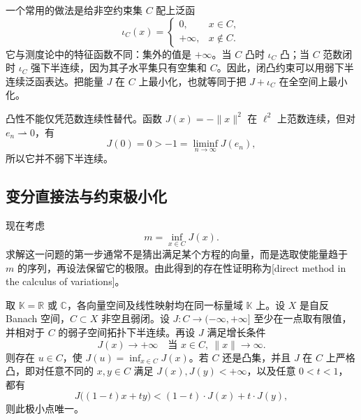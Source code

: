 一个常用的做法是给非空约束集 \(C\) 配上泛函
\[
  \iota_C(x)=
  \begin{cases}
    0,&x\in C,\\
    +\infty,&x\notin C.
  \end{cases}
\]
它与测度论中的特征函数不同：集外的值是 \(+\infty\)。当 \(C\) 凸时 \(\iota_C\) 凸；当 \(C\) 范数闭时 \(\iota_C\) 强下半连续，因为其子水平集只有空集和 \(C\)。因此，闭凸约束可以用弱下半连续泛函表达。把能量 \(J\) 在 \(C\) 上最小化，也就等同于把 \(J+\iota_C\) 在全空间上最小化。

\ProseParagraphBreak

凸性不能仅凭范数连续性替代。函数 \(J(x)=-\|x\|^2\) 在 \(\ell^2\) 上范数连续，但对 \(e_n\rightharpoonup0\)，有
\[
  J(0)=0>-1=\liminf_{n\to\infty}J(e_n),
\]
所以它并不弱下半连续。

\subsection{变分直接法与约束极小化}
\label{b1:subsec:090505}

现在考虑
\[
  m=\inf_{x\in C}J(x).
\]
求解这一问题的第一步通常不是猜出满足某个方程的向量，而是选取使能量趋于 \(m\) 的序列，再设法保留它的极限。由此得到的存在性证明称为[direct method in the calculus of variations]。

\begin{theorem}[变分直接法]
\label{b1:thm:direct-method}
取 \(\mathbb K=\mathbb R\) 或 \(\mathbb C\)，各向量空间及线性映射均在同一标量域 \(\mathbb K\) 上。设 \(X\) 是自反 Banach 空间，\(C\subset X\) 非空且弱闭。设 \(J:C\to(-\infty,+\infty]\) 至少在一点取有限值，并相对于 \(C\) 的弱子空间拓扑下半连续。再设 \(J\) 满足增长条件
\begin{equation}
\label{b1:eq:direct-method-growth}
  J(x)\longrightarrow+\infty
  \quad\text{当 }x\in C,\ \|x\|\longrightarrow\infty.
\end{equation}
则存在 \(u\in C\)，使 \(J(u)=\inf_{x\in C}J(x)\)。若 \(C\) 还是凸集，并且 \(J\) 在 \(C\) 上严格凸，即对任意不同的 \(x,y\in C\) 满足 \(J(x),J(y)<+\infty\)，以及任意 \(0<t<1\)，都有
\[
 J\bigl((1-t)x+ty\bigr)<(1-t)\cdot J(x)+t\cdot J(y),
\]
则此极小点唯一。
\end{theorem}

